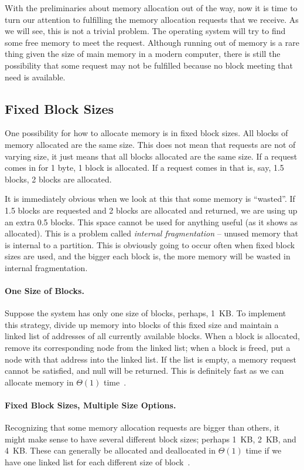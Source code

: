 With the preliminaries about memory allocation out of the way, now it is time to turn our attention to fulfilling the memory allocation requests that we receive. As we will see, this is not a trivial problem. The operating system will try to find some free memory to meet the request. Although running out of memory is a rare thing given the size of main memory in a modern computer, there is still the possibility that some request may not be fulfilled because no block meeting that need is available.

\subsection*{Fixed Block Sizes}
One possibility for how to allocate memory is in fixed block sizes. All blocks of memory allocated are the same size. This does not mean that requests are not of varying size, it just means that all blocks allocated are the same size. If a request comes in for 1 byte, 1 block is allocated. If a request comes in that is, say, 1.5 blocks, 2 blocks are allocated. 

It is immediately obvious when we look at this that some memory is ``wasted''. If 1.5 blocks are requested and 2 blocks are allocated and returned, we are using up an extra 0.5 blocks. This space cannot be used for anything useful (as it shows as allocated). This is a problem called \textit{internal fragmentation} -- unused memory that is internal to a partition. This is obviously going to occur often when fixed block sizes are used, and the bigger each block is, the more memory will be wasted in internal fragmentation. 

\paragraph{One Size of Blocks.} Suppose the system has only one size of blocks, perhaps, 1~KB. To implement this strategy, divide up memory into blocks of this fixed size and maintain a linked list of addresses of all currently available blocks. When a block is allocated, remove its corresponding node from the linked list; when a block is freed, put a node with that address into the linked list. If the list is empty, a memory request cannot be satisfied, and null will be returned. This is definitely fast as we can allocate memory in $\Theta(1)$ time~\cite{mte241}.

\paragraph{Fixed Block Sizes, Multiple Size Options.} Recognizing that some memory allocation requests are bigger than others, it might make sense to have several different block sizes; perhaps 1~KB, 2~KB, and 4~KB. These can generally be allocated and deallocated in $\Theta(1)$ time if we have one linked list for each different size of block~\cite{mte241}.

